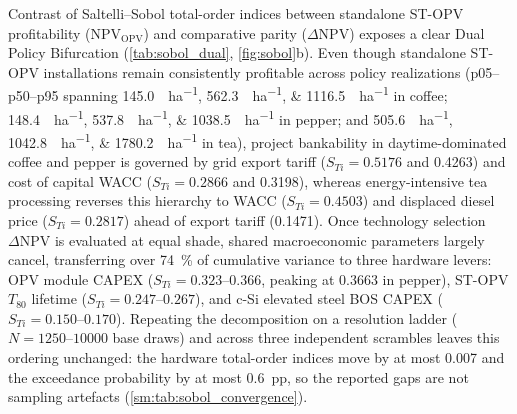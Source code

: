 \documentclass[preprint,12pt,a4paper]{elsarticle}
\begin{document}
Contrast of Saltelli--Sobol total-order indices between standalone ST-OPV profitability ($\mathrm{NPV}_{\mathrm{OPV}}$) and comparative parity ($\Delta\mathrm{NPV}$) exposes a clear Dual Policy Bifurcation (\cref{tab:sobol_dual}, \cref{fig:sobol}b). Even though standalone ST-OPV installations remain consistently profitable across policy realizations (p05--p50--p95 spanning \qtylist{145.0;562.3;1116.5}{\kUSD\per\hectare} in coffee; \qtylist{148.4;537.8;1038.5}{\kUSD\per\hectare} in pepper; and \qtylist{505.6;1042.8;1780.2}{\kUSD\per\hectare} in tea), project bankability in daytime-dominated coffee and pepper is governed by grid export tariff ($S_{Ti}=\num{0.5176}$ and \num{0.4263}) and cost of capital WACC ($S_{Ti}=\num{0.2866}$ and \num{0.3198}), whereas energy-intensive tea processing reverses this hierarchy to WACC ($S_{Ti}=\num{0.4503}$) and displaced diesel price ($S_{Ti}=\num{0.2817}$) ahead of export tariff (\num{0.1471}). Once technology selection $\Delta\mathrm{NPV}$ is evaluated at equal shade, shared macroeconomic parameters largely cancel, transferring over \qty{74}{\percent} of cumulative variance to three hardware levers: OPV module CAPEX ($S_{Ti}=\numrange{0.323}{0.366}$, peaking at \num{0.3663} in pepper), ST-OPV $T_{80}$ lifetime ($S_{Ti}=\numrange{0.247}{0.267}$), and c-Si elevated steel BOS CAPEX ($S_{Ti}=\numrange{0.150}{0.170}$). Repeating the decomposition on a resolution ladder ($N=1250$--$\num{10000}$ base draws) and across three independent scrambles leaves this ordering unchanged: the hardware total-order indices move by at most \num{0.007} and the exceedance probability by at most \qty{0.6}{pp}, so the reported gaps are not sampling artefacts (\cref{sm:tab:sobol_convergence}).
\end{document}
